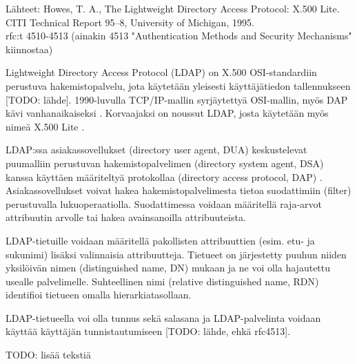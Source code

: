 Lähteet: Howes, T. A., The Lightweight Directory Access Protocol: X.500 Lite. CITI
Technical Report 95–8, University of Michigan, 1995. \cite{howes} \\
rfc:t 4510-4513 (ainakin 4513 "Authentication Methods and Security Mechanisms" kiinnostaa)

Lightweight Directory Access Protocol (LDAP) on X.500 OSI-standardiin perustuva hakemistopalvelu, jota käytetään yleisesti käyttäjätiedon tallennukseen [TODO: lähde]. 1990-luvulla TCP/IP-mallin syrjäytettyä OSI-mallin, myös DAP kävi vanhanaikaiseksi \cite{howes}. Korvaajaksi on noussut LDAP, josta käytetään myös nimeä X.500 Lite \cite{howes}.

LDAP:ssa asiakassovellukset (directory user agent, DUA) keskustelevat puumalliin perustuvan hakemistopalvelimen (directory system agent, DSA) kanssa käyttäen määriteltyä protokollaa (directory access protocol, DAP) \cite{howes}. Asiakassovellukset voivat hakea hakemistopalvelimesta tietoa suodattimiin (filter) perustuvalla lukuoperaatiolla. Suodattimessa voidaan määritellä raja-arvot attribuutin arvolle tai hakea avainsanoilla attribuuteista.

LDAP-tietuille voidaan määritellä pakollisten attribuuttien (esim. etu- ja sukunimi) lisäksi valinnaisia attribuutteja. Tietueet on järjestetty puuhun niiden yksilöivän nimen (distinguished name, DN) mukaan ja ne voi olla hajautettu usealle palvelimelle. Suhteellinen nimi (relative distinguished name, RDN) identifioi tietueen omalla hierarkiatasollaan.

LDAP-tietueella voi olla tunnus sekä salasana ja LDAP-palvelinta voidaan käyttää käyttäjän tunnistautumiseen [TODO: lähde, ehkä rfc4513].

TODO: lisää tekstiä
